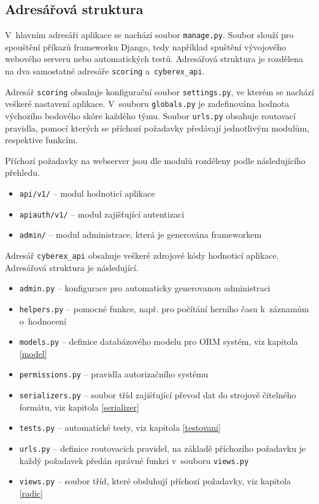 \documentclass[
  digital,
  twoside,
  table, 
  nolof, 
  nolot
]{fithesis3}
\begin{document}
\subsection{Adresářová struktura}
V~hlavním adresáři aplikace se nachází soubor \texttt{manage.py}. Soubor slouží pro spouštění příkazů frameworku Django, tedy například spuštění vývojového webového serveru nebo automatických testů. Adresářová struktura je rozdělena na dva samostatné adresáře \texttt{scoring} a~\texttt{cyberex\_api}.

Adresář \texttt{scoring} obsahuje konfigurační soubor \texttt{settings.py}, ve kterém se nachází veškeré nastavení aplikace. V~souboru \texttt{globals.py} je zadefinována hodnota výchozího bodového skóre každého týmu. Soubor \texttt{urls.py} obsahuje routovací pravidla, pomocí kterých se příchozí požadavky předávají jednotlivým modulům, respektive funkcím.

Příchozí požadavky na webserver jsou dle modulů rozděleny podle následujícího přehledu.

\begin{itemize}
    \item \texttt{api/v1/} -- modul hodnoticí aplikace
    \item \texttt{api\-auth/v1/} -- modul zajišťující autentizaci
    \item \texttt{admin/} -- modul administrace, která je generována frameworkem
\end{itemize}

Adresář \texttt{cyberex\_api} obsahuje veškeré zdrojové kódy hodnoticí aplikace. Adresářová struktura je následující.

\begin{itemize}
    \item \texttt{admin.py} -- konfigurace pro automaticky generovanou administraci
    \item \texttt{helpers.py} -- pomocné funkce, např. pro počítání herního času k~záznamům o~hodnocení
    \item \texttt{models.py} -- definice databázového modelu pro ORM systém, viz kapitola \ref{model}
    \item \texttt{permissions.py} -- pravidla autorizačního systému
    \item \texttt{serializers.py} -- soubor tříd zajišťující převod dat do strojově čitelného formátu, viz kapitola \ref{serializer}
    \item \texttt{tests.py} -- automatické testy, viz kapitola \ref{testovani}
    \item \texttt{urls.py} -- definice routovacích pravidel, na základě příchozího požadavku je každý požadavek předán správné funkci v~souboru \texttt{views.py}
    \item \texttt{views.py} -- soubor tříd, které obsluhují příchozí požadavky, viz kapitola \ref{radic}
\end{itemize}
\end{document}
